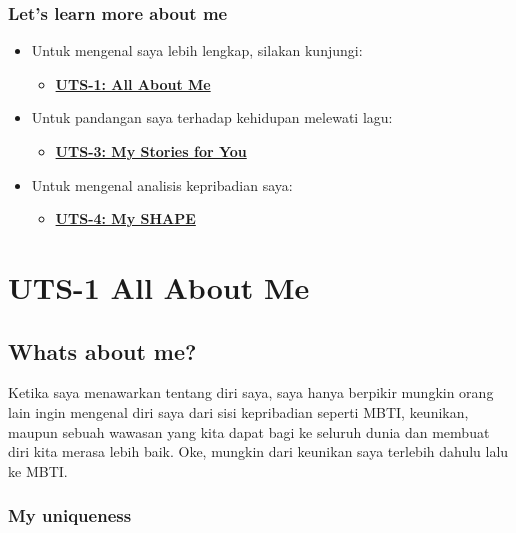 \documentclass[
  letterpaper,
  DIV=11,
  numbers=noendperiod]{scrreprt}
\providecommand{\tightlist}{%
  \setlength{\itemsep}{0pt}\setlength{\parskip}{0pt}}
\begin{document}
\subsection*{Let's learn more about me}\label{lets-learn-more-about-me}

\begin{itemize}
\tightlist
\item
  Untuk mengenal saya lebih lengkap, silakan kunjungi:

  \begin{itemize}
  \tightlist
  \item
    \textbf{\href{./All_About_me/index.qmd}{UTS-1: All About Me}}
  \end{itemize}
\item
  Untuk pandangan saya terhadap kehidupan melewati lagu:

  \begin{itemize}
  \tightlist
  \item
    \textbf{\href{./My_Stories_for_You/index.qmd}{UTS-3: My Stories for
    You}}
  \end{itemize}
\item
  Untuk mengenal analisis kepribadian saya:

  \begin{itemize}
  \tightlist
  \item
    \textbf{\href{./My_Shapes/index.qmd}{UTS-4: My SHAPE}}
  \end{itemize}
\end{itemize}


\chapter{UTS-1 All About Me}\label{uts-1-all-about-me}

\section{Whats about me?}\label{whats-about-me}

Ketika saya menawarkan tentang diri saya, saya hanya berpikir mungkin
orang lain ingin mengenal diri saya dari sisi kepribadian seperti MBTI,
keunikan, maupun sebuah wawasan yang kita dapat bagi ke seluruh dunia
dan membuat diri kita merasa lebih baik. Oke, mungkin dari keunikan saya
terlebih dahulu lalu ke MBTI.

\subsection{My uniqueness}\label{my-uniqueness}
\end{document}
